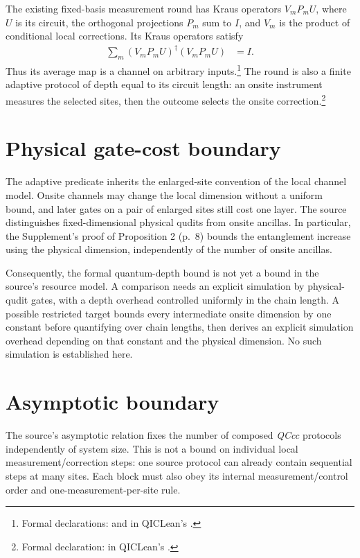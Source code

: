 \documentclass{article}
\begin{document}
The existing fixed-basis measurement round has Kraus operators
$V_mP_mU$, where $U$ is its circuit, the orthogonal projections $P_m$ sum to
$I$, and $V_m$ is the product of conditional local corrections.
Its Kraus operators satisfy
\begin{align}
  \sum_m(V_mP_mU)^{\dagger}(V_mP_mU)&=I.
\end{align}
Thus its average map is a channel on arbitrary inputs.\footnote{Formal declarations:
 and
 in QICLean's
.}
The round is also a finite adaptive protocol of depth equal to its circuit
length: an onsite instrument measures the selected sites, then the outcome
selects the onsite correction.\footnote{Formal declaration:
 in QICLean's
.}

\section{Physical gate-cost boundary}
The adaptive predicate inherits the enlarged-site convention of the local
channel model. Onsite channels may change the local dimension without a
uniform bound, and later gates on a pair of enlarged sites still cost one
layer. The source distinguishes fixed-dimensional physical qudits from
onsite ancillas. In particular, the Supplement's proof of Proposition 2
(p.~8) bounds the entanglement increase using the physical dimension,
independently of the number of onsite ancillas.

Consequently, the formal quantum-depth bound is not yet a bound in the
source's resource model. A comparison needs an explicit simulation by
physical-qudit gates, with a depth overhead controlled uniformly in the
chain length. A possible restricted target bounds every intermediate
onsite dimension by one constant before quantifying over chain lengths,
then derives an explicit simulation overhead depending on that constant
and the physical dimension. No such simulation is established here.

\section{Asymptotic boundary}
The source's asymptotic relation fixes the number of composed
\textit{QCcc} protocols independently of system size. This is not a bound
on individual local measurement/correction steps: one source protocol can
already contain sequential steps at many sites. Each block must also obey
its internal measurement/control order and one-measurement-per-site rule.
\end{document}
